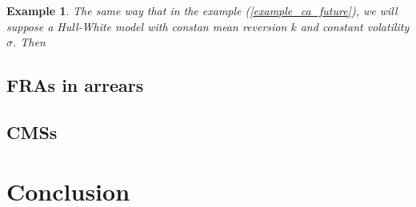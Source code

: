 \documentclass[a4paper,10pt]{article}
\newtheorem{example}[theorem]{Example}
\newcommand{\1}{\mathbf{1}}
\begin{document}
\begin{example}
The same way that in the example (\ref{example_ca_future}), we will suppose a Hull-White model with constan mean reversion $k$ and constant volatility $\sigma$. Then
\end{example}

\subsection{FRAs in arrears}

\subsection{CMSs}

\section{Conclusion}\label{sec:Conclusion}




%
\end{document}
